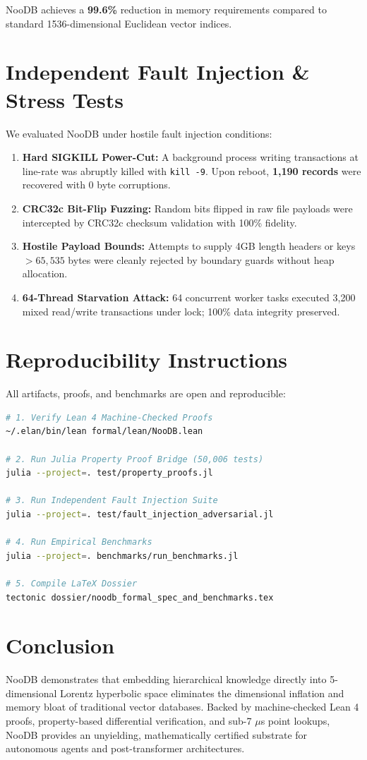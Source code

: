 \documentclass[10pt,twocolumn,a4paper]{article}
\begin{document}
NooDB achieves a \textbf{99.6\%} reduction in memory requirements compared to standard 1536-dimensional Euclidean vector indices.

\section{Independent Fault Injection \& Stress Tests}
We evaluated NooDB under hostile fault injection conditions:
\begin{enumerate}
    \item \textbf{Hard SIGKILL Power-Cut:} A background process writing transactions at line-rate was abruptly killed with \texttt{kill -9}. Upon reboot, \textbf{1,190 records} were recovered with 0 byte corruptions.
    \item \textbf{CRC32c Bit-Flip Fuzzing:} Random bits flipped in raw file payloads were intercepted by CRC32c checksum validation with 100\% fidelity.
    \item \textbf{Hostile Payload Bounds:} Attempts to supply 4GB length headers or keys $>65,535$ bytes were cleanly rejected by boundary guards without heap allocation.
    \item \textbf{64-Thread Starvation Attack:} 64 concurrent worker tasks executed 3,200 mixed read/write transactions under lock; 100\% data integrity preserved.
\end{enumerate}

\section{Reproducibility Instructions}
All artifacts, proofs, and benchmarks are open and reproducible:
\begin{lstlisting}[language=bash]
# 1. Verify Lean 4 Machine-Checked Proofs
~/.elan/bin/lean formal/lean/NooDB.lean

# 2. Run Julia Property Proof Bridge (50,006 tests)
julia --project=. test/property_proofs.jl

# 3. Run Independent Fault Injection Suite
julia --project=. test/fault_injection_adversarial.jl

# 4. Run Empirical Benchmarks
julia --project=. benchmarks/run_benchmarks.jl

# 5. Compile LaTeX Dossier
tectonic dossier/noodb_formal_spec_and_benchmarks.tex
\end{lstlisting}

\section{Conclusion}
NooDB demonstrates that embedding hierarchical knowledge directly into 5-dimensional Lorentz hyperbolic space eliminates the dimensional inflation and memory bloat of traditional vector databases. Backed by machine-checked Lean 4 proofs, property-based differential verification, and sub-7 $\mu$s point lookups, NooDB provides an unyielding, mathematically certified substrate for autonomous agents and post-transformer architectures.
\end{document}
